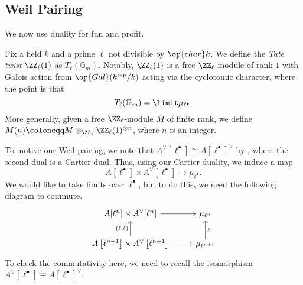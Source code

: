 \documentclass[../notes.tex]{subfiles}
\begin{document}
\subsection{Weil Pairing}
We now use duality for fun and profit.
\begin{definition}
	Fix a field $k$ and a prime $\ell$ not divisible by $\op{char}k$. We define the \textit{Tate twist} $\ZZ_\ell(1)$ as $T_\ell(\mathbb G_m)$. Notably, $\ZZ_\ell(1)$ is a free $\ZZ_\ell$-module of rank $1$ with Galois action from $\op{Gal}(k^{\mathrm{sep}}/k)$ acting via the cyclotomic character, where the point is that
	\[T_\ell(\mathbb G_m)=\limit\mu_{\ell^\bullet}.\]
	More generally, given a free $\ZZ_\ell$-module $M$ of finite rank, we define $M(n)\coloneqq M\otimes_{\ZZ_\ell}\ZZ_\ell(1)^{\otimes n}$, where $n$ is an integer.
\end{definition}
To motive our Weil pairing, we note that $A^\lor[\ell^\bullet]\cong A[\ell^\bullet]^\lor$ by , where the second dual is a Cartier dual. Thus, using our Cartier duality, we induce a map
\[A[\ell^\bullet]\times A^\lor[\ell^\bullet]\to\mu_{\ell^\bullet}.\]
We would like to take limits over $\ell^\bullet$, but to do this, we need the following diagram to commute.
\[\begin{tikzcd}
	{A[\ell^n]\times A^\lor[\ell^n]} & {\mu_{\ell^n}} \\
	{A\left[\ell^{n+1}\right]\times A^\lor\left[\ell^{n+1}\right]} & {\mu_{\ell^{n+1}}}
	\arrow["{(\ell,\ell)}", from=2-1, to=1-1]
	\arrow["\ell"', from=2-2, to=1-2]
	\arrow[from=1-1, to=1-2]
	\arrow[from=2-1, to=2-2]
\end{tikzcd}\]
To check the commutativity here, we need to recall the isomorphism $A^\lor[\ell^\bullet]\cong A[\ell^\bullet]^\lor$.
\end{document}
